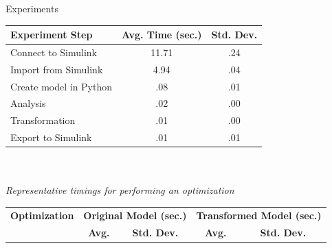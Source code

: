 \documentclass[final,hyperref={pdfpagelabels=false}]{beamer}
\begin{document}
\begin{frame}{}
\begin{columns}[t]
     \begin{column}{.385\linewidth}
             \begin{block}{Experiments}
             \footnotesize
             \begin{table}[h]
             
             \centering
             \begin{tabular}{l | c c }
             
             \textbf{Experiment Step} & \textbf{Avg. Time (sec.)} & \textbf{Std. Dev.} \\\hline
              
             Connect to Simulink & 11.71 & .24 \\
             Import from Simulink & 4.94 & .04 \\
             Create model in Python & .08 & .01 \\
             Analysis & .02 & .00 \\
             Transformation & .01 & .00 \\
             Export to Simulink & .01 & .01 \\
             
             
             \end{tabular}
             ~\\~\\
             \footnotesize \textit{Representative timings for performing an optimization}
             \end{table}
             
             \begin{table}[h]
             
             \centering
             \begin{tabular}{l | c c c c }
             
             \textbf{Optimization} &\multicolumn{2}{c}{\textbf{Original Model (sec.)}}& \multicolumn{2}{c}{\textbf{Transformed Model (sec.)}} \\
              & \textbf{Avg.} & \textbf{Std. Dev.} & \textbf{Avg.} &\textbf{ Std. Dev.}\\\hline
              

\end{tabular}
\end{table}
\end{block}
\end{column}
\end{columns}
\end{frame}
\end{document}
